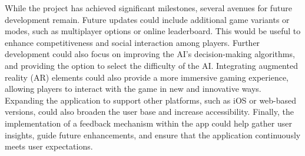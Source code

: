 While the project has achieved significant milestones, several avenues for future development remain. Future updates could include additional game variants or modes, such as multiplayer options or online leaderboard. This would be useful to enhance competitiveness and social interaction among players. Further development could also focus on improving the AI's decision-making algorithms, and providing the option to select the difficulty of the AI. Integrating augmented reality (AR) elements could also provide a more immersive gaming experience, allowing players to interact with the game in new and innovative ways. Expanding the application to support other platforms, such as iOS or web-based versions, could also broaden the user base and increase accessibility. Finally, the implementation of a feedback mechanism within the app could help gather user insights, guide future enhancements, and ensure that the application continuously meets user expectations.